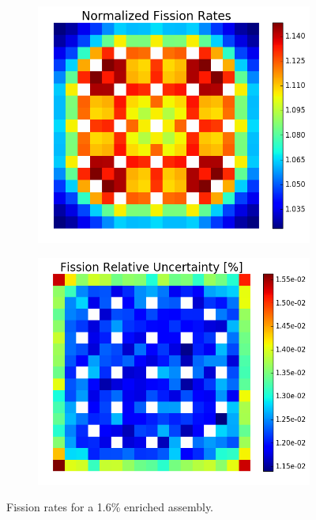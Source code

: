 \begin{figure}[h!]
\centering
\begin{subfigure}{0.44\textwidth}
  \centering
  \includegraphics[width=\linewidth]{figures/benchmarks/fission-rates/fiss-mean-assm-16}
  \caption{}
  \label{fig:chap7-fiss-rate-mean-1.6-assm}
\end{subfigure}%
\begin{subfigure}{0.44\textwidth}
  \centering
  \includegraphics[width=\linewidth]{figures/benchmarks/fission-rates/fiss-rel-err-assm-16}
  \caption{}
  \label{fig:chap7-fiss-rate-rel-err-1.6-assm}
\end{subfigure}%
\caption[Fission rates for a 1.6\% enriched assembly]{Fission rates for a 1.6\% enriched assembly.}
\label{fig:chap7-fiss-rates-1.6-assm}
\end{figure}

